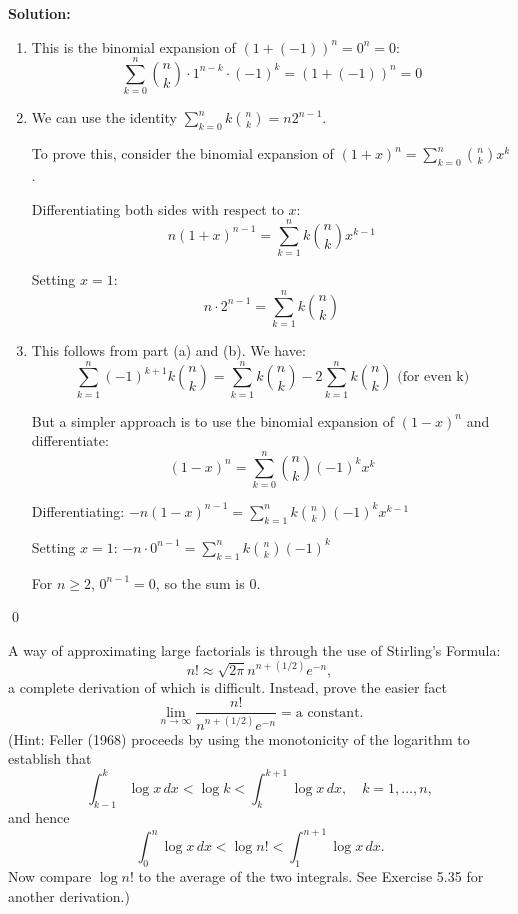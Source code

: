 \noindent\textbf{Solution:}
\begin{enumerate}[label=(\alph*)]
    \item This is the binomial expansion of $(1 + (-1))^n = 0^n = 0$:
    \[ \sum_{k=0}^{n} \binom{n}{k} \cdot 1^{n-k} \cdot (-1)^k = (1 + (-1))^n = 0 \]
    
    \item We can use the identity $\sum_{k=0}^{n} k \binom{n}{k} = n2^{n-1}$.
    
    To prove this, consider the binomial expansion of $(1 + x)^n = \sum_{k=0}^{n} \binom{n}{k} x^k$.
    
    Differentiating both sides with respect to $x$:
    \[ n(1 + x)^{n-1} = \sum_{k=1}^{n} k \binom{n}{k} x^{k-1} \]
    
    Setting $x = 1$:
    \[ n \cdot 2^{n-1} = \sum_{k=1}^{n} k \binom{n}{k} \]
    
    \item This follows from part (a) and (b). We have:
    \[ \sum_{k=1}^{n} (-1)^{k+1} k \binom{n}{k} = \sum_{k=1}^{n} k \binom{n}{k} - 2 \sum_{k=1}^{n} k \binom{n}{k} \text{ (for even k)} \]
    
    But a simpler approach is to use the binomial expansion of $(1 - x)^n$ and differentiate:
    \[ (1 - x)^n = \sum_{k=0}^{n} \binom{n}{k} (-1)^k x^k \]
    
    Differentiating: $-n(1 - x)^{n-1} = \sum_{k=1}^{n} k \binom{n}{k} (-1)^k x^{k-1}$
    
    Setting $x = 1$: $-n \cdot 0^{n-1} = \sum_{k=1}^{n} k \binom{n}{k} (-1)^k$
    
    For $n \geq 2$, $0^{n-1} = 0$, so the sum is 0.
\end{enumerate}



\qed
\begin{problembox}
A way of approximating large factorials is through the use of Stirling's Formula:
\[ n!\approx\sqrt{2\pi}n^{n+(1/2)}e^{-n}, \]
a complete derivation of which is difficult. Instead, prove the easier fact
\[ \lim_{n\to\infty}\frac{n!}{n^{n+(1/2)}e^{-n}}=\text{a constant}. \]
(Hint: Feller (1968) proceeds by using the monotonicity of the logarithm to establish that
\[ \int_{k-1}^{k}\log x\,dx<\log k<\int_{k}^{k+1}\log x\,dx,\quad k=1,\ldots,n, \]
and hence
\[ \int_{0}^{n}\log x\,dx<\log n!<\int_{1}^{n+1}\log x\,dx. \]
Now compare $\log n!$ to the average of the two integrals. See Exercise 5.35 for another derivation.)
\end{problembox}

